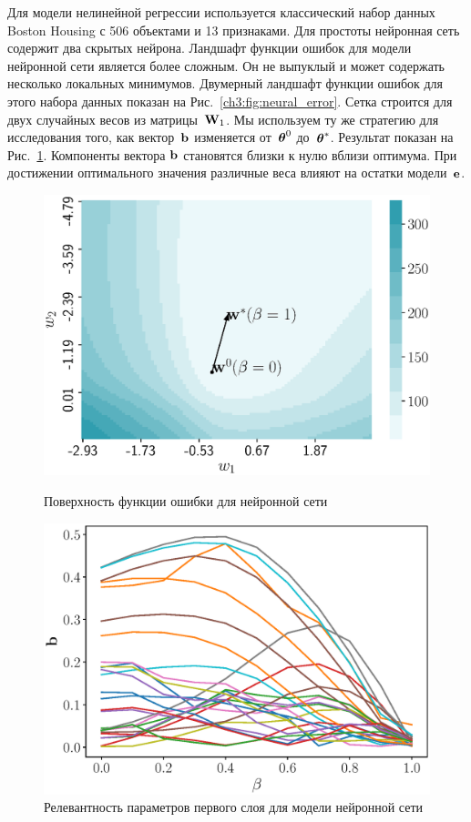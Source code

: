 Для модели нелинейной регрессии используется классический набор данных Boston Housing с 506 объектами и 13 признаками.
Для простоты нейронная сеть содержит два скрытых нейрона.
Ландшафт функции ошибок для модели нейронной сети является более сложным. 
Он не выпуклый и может содержать несколько локальных минимумов.
Двумерный ландшафт функции ошибок для этого набора данных показан на Рис.~\ref{ch3:fig:neural_error}. 
Сетка строится для двух случайных весов из матрицы~$\mathbf{W}_1$.
Мы используем ту же стратегию для исследования того, как вектор~$\mathbf{b}$ изменяется от~$\boldsymbol{\theta}^0$ до~$\boldsymbol{\theta}^*$. 
Результат показан на Рис.~\ref{ch3:fig:neural_b_wrt_beta}.
Компоненты вектора $\mathbf{b}$ становятся близки к нулю вблизи оптимума. 
При достижении оптимального значения различные веса влияют на остатки модели~$\mathbf{e}$.
\begin{figure}
	\centering
	\begin{minipage}{.5\textwidth}
		\centering
		\includegraphics[width=\linewidth]{figs/ch3/neural_error}
		\caption{Поверхность функции ошибки для нейронной сети}
		\label{ch3:fig:neural_error}
	\end{minipage}%
	\begin{minipage}{.5\textwidth}
		\centering
		\includegraphics[width=\linewidth]{figs/ch3/neural_b_wrt_beta}
		\caption{Релевантность параметров первого слоя для модели нейронной сети}
		\label{ch3:fig:neural_b_wrt_beta}
	\end{minipage}
\end{figure}

